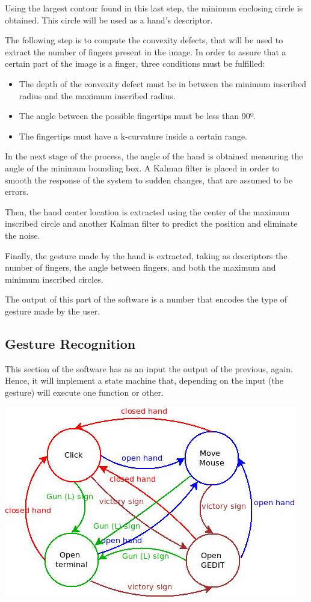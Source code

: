 \documentclass{article}
\begin{document}
Using the largest contour found in this last step, the minimum enclosing circle is obtained. This circle will be used as a hand's descriptor.

The following step is to compute the convexity defects, that will be used to extract the number of fingers present in the image. 
In order to assure that a certain part of the image is a finger, three conditions must be fulfilled: 
\begin{itemize}
\item The depth of the convexity defect must be in between the minimum inscribed radius and the maximum inscribed radius. 
\item The angle between the possible fingertips must be less than 90º. 
\item The fingertips must have a k-curvature inside a certain range.
\end{itemize}

In the next stage of the process, the angle of the hand is obtained measuring the angle of the minimum bounding box. A Kalman filter is placed in order to smooth the response of the system to sudden changes, that are assumed to be errors. 

Then, the hand center location is extracted using the center of the maximum inscribed circle and another Kalman filter to predict the position and eliminate the noise. 

Finally, the gesture made by the hand is extracted, taking as descriptors the number of fingers, the angle between fingers, and both the maximum and minimum inscribed circles. 

The output of this part of the software is a number that encodes the type of gesture made by the user.


\subsection{Gesture Recognition} 
This section of the software has as an input the output of the previous, again. Hence, it will implement a state machine that, depending on the input (the gesture) will execute one function or other. 

\begin{center}
\includegraphics[scale=0.6]{../gesture_recognition.jpeg} 
\end{center}
\end{document}
